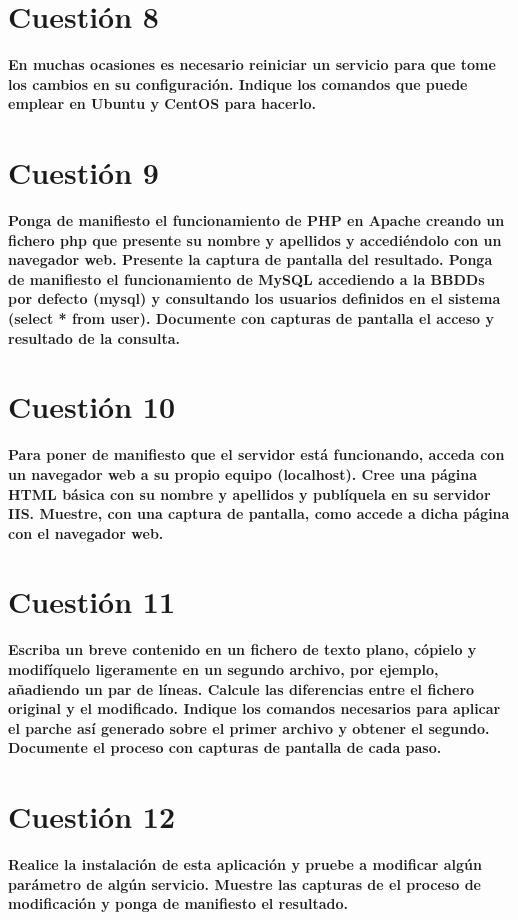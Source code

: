 \documentclass[a4paper,11pt]{article}
\newenvironment{answer}{%
\begin{list}{}{%
}%
\item[]}{\end{list}}
\begin{document}
\section{Cuestión 8}
\textbf{En muchas ocasiones es necesario reiniciar un servicio para que tome los cambios en su configuración. Indique los 
comandos que puede emplear en Ubuntu y CentOS para hacerlo.}
\begin{answer}
  
\end{answer}

\section{Cuestión 9}
\textbf{Ponga de manifiesto el funcionamiento de PHP en Apache creando un fichero php que presente su nombre y apellidos 
y accediéndolo con un navegador web. Presente la captura de pantalla del resultado. Ponga de manifiesto el funcionamiento
de MySQL accediendo a la BBDDs por defecto (mysql) y consultando los usuarios definidos en el sistema (select * from user). 
Documente con capturas de pantalla el acceso y resultado de la consulta.}
\begin{answer}
  
\end{answer}

\section{Cuestión 10}
\textbf{Para poner de manifiesto que el servidor está funcionando, acceda con un navegador web a su propio equipo 
(localhost). Cree una página HTML básica con su nombre y apellidos y publíquela en su servidor IIS. Muestre, con una 
captura de pantalla, como accede a dicha página con el navegador web.}
\begin{answer}
  
\end{answer}

\section{Cuestión 11}
\textbf{Escriba un breve contenido en un fichero de texto plano, cópielo y modifíquelo ligeramente en un segundo archivo, 
por ejemplo, añadiendo un par de líneas. Calcule las diferencias entre el fichero original y el modificado. Indique los
comandos necesarios para aplicar el parche así generado sobre el primer archivo y obtener el segundo. Documente el proceso 
con capturas de pantalla de cada paso.}
\begin{answer}
  
\end{answer}

\section{Cuestión 12}
\textbf{Realice la instalación de esta aplicación y pruebe a modificar algún parámetro de algún servicio. Muestre las 
capturas de el proceso de modificación y ponga de manifiesto el resultado.}
\begin{answer}
  
\end{answer}

\printbibliography
\end{document}
